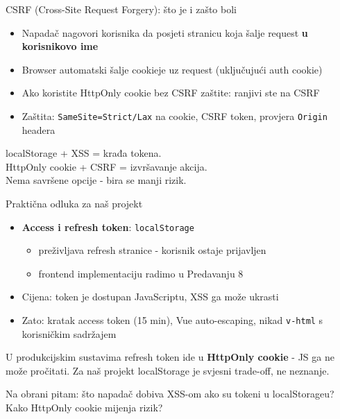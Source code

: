 \begin{frame}{CSRF (Cross-Site Request Forgery): što je i zašto boli}
	\begin{itemize}
		\item Napadač nagovori korisnika da posjeti stranicu koja šalje request \textbf{u korisnikovo ime}
		\item Browser automatski šalje cookieje uz request (uključujući auth cookie)
		\item Ako koristite HttpOnly cookie bez CSRF zaštite: ranjivi ste na CSRF
		\item Zaštita: \texttt{SameSite=Strict/Lax} na cookie, CSRF token, provjera \texttt{Origin} headera
	\end{itemize}

	\vspace{0.6em}
	localStorage + XSS = krađa tokena. \\
	HttpOnly cookie + CSRF = izvršavanje akcija. \\
	Nema savršene opcije - bira se manji rizik.
\end{frame}

\begin{frame}{Praktična odluka za naš projekt}
	\begin{itemize}
		\item \textbf{Access i refresh token}: \texttt{localStorage}
		\begin{itemize}
			\item preživljava refresh stranice - korisnik ostaje prijavljen
			\item frontend implementaciju radimo u Predavanju 8
		\end{itemize}
		\item Cijena: token je dostupan JavaScriptu, XSS ga može ukrasti
		\item Zato: kratak access token (15 min), Vue auto-escaping, nikad \texttt{v-html} s korisničkim sadržajem
	\end{itemize}

	\vspace{0.6em}
	U produkcijskim sustavima refresh token ide u \textbf{HttpOnly cookie} - JS ga ne može pročitati. Za naš projekt localStorage je svjesni trade-off, ne neznanje.

	\vspace{0.4em}
	Na obrani pitam: što napadač dobiva XSS-om ako su tokeni u localStorageu? Kako HttpOnly cookie mijenja rizik?
\end{frame}

